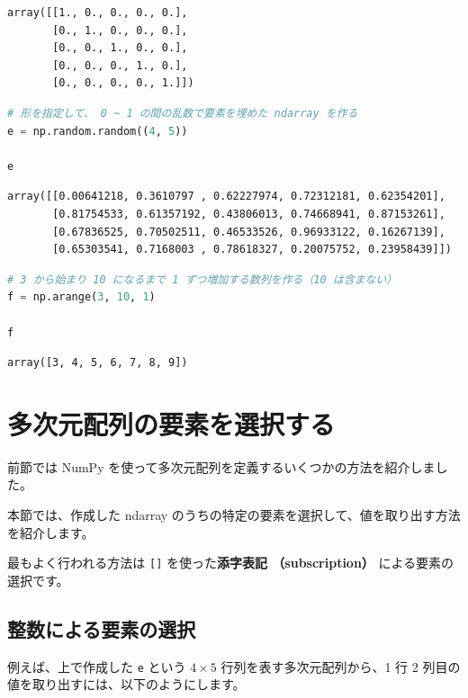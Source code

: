 \begin{lstlisting}[style=outputcell]
array([[1., 0., 0., 0., 0.],
       [0., 1., 0., 0., 0.],
       [0., 0., 1., 0., 0.],
       [0., 0., 0., 1., 0.],
       [0., 0., 0., 0., 1.]])
\end{lstlisting}

\begin{lstlisting}[style=codecell,language=Python]
# 形を指定して、 0 ~ 1 の間の乱数で要素を埋めた ndarray を作る
e = np.random.random((4, 5))

e
\end{lstlisting}

\begin{lstlisting}[style=outputcell]
array([[0.00641218, 0.3610797 , 0.62227974, 0.72312181, 0.62354201],
       [0.81754533, 0.61357192, 0.43806013, 0.74668941, 0.87153261],
       [0.67836525, 0.70502511, 0.46533526, 0.96933122, 0.16267139],
       [0.65303541, 0.7168003 , 0.78618327, 0.20075752, 0.23958439]])
\end{lstlisting}

\begin{lstlisting}[style=codecell,language=Python]
# 3 から始まり 10 になるまで 1 ずつ増加する数列を作る（10 は含まない）
f = np.arange(3, 10, 1)

f
\end{lstlisting}

\begin{lstlisting}[style=outputcell]
array([3, 4, 5, 6, 7, 8, 9])
\end{lstlisting}

\section{多次元配列の要素を選択する}


前節では NumPy を使って多次元配列を定義するいくつかの方法を紹介しました。

本節では、作成した ndarray のうちの特定の要素を選択して、値を取り出す方法を紹介します。

最もよく行われる方法は \texttt{[]} を使った\textbf{添字表記 （subscription）} による要素の選択です。


\subsection{整数による要素の選択}


例えば、上で作成した \texttt{e} という $4 \times 5$ 行列を表す多次元配列から、1 行 2 列目の値を取り出すには、以下のようにします。


